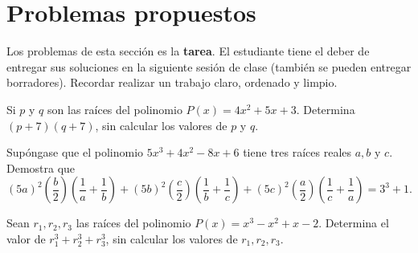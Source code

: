 \section{Problemas propuestos}

Los problemas de esta sección es la \textbf{tarea}.
El estudiante tiene el deber de entregar sus soluciones en la siguiente sesión de clase (también se pueden entregar borradores).
Recordar realizar un trabajo claro, ordenado y limpio.

\begin{multicols}{2}
    \begin{problem}
        Si $p$ y $q$ son las raíces del polinomio $P(x) = 4x^2 + 5x + 3$.
        Determina $(p + 7)(q + 7)$, sin calcular los valores de $p$ y $q$.
    \end{problem}

    \begin{problem}
        Supóngase que el polinomio $5x^3 + 4x^2 - 8x + 6$ tiene tres raíces reales $a, b \mbox{ y } c$.
        Demostra que \[(5a)^2\left(\frac{b}{2}\right)\left(\frac{1}{a} + \frac{1}{b}\right) + (5b)^2\left(\frac{c}{2}\right)\left(\frac{1}{b} + \frac{1}{c}\right)+ (5c)^2\left(\frac{a}{2}\right)\left(\frac{1}{c} + \frac{1}{a}\right) = 3^3 + 1.\]
    \end{problem}

    \begin{problem}
        Sean $r_1, r_2, r_3$ las raíces del polinomio $P(x) = x^3 - x^2 + x - 2$.
        Determina el valor de $r^3_1 + r^3_2 + r^3_3$, sin calcular los valores de $r_1, r_2, r_3$.
    \end{problem}
\end{multicols}